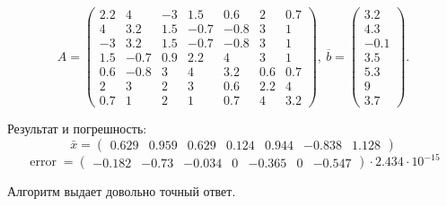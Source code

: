         \[
            A = \begin{pmatrix}
                2.2 & 4 & -3 & 1.5 & 0.6 & 2 & 0.7 \\
                4 & 3.2 & 1.5 & -0.7 & -0.8 & 3 & 1 \\
                -3 & 3.2 & 1.5 & -0.7 & -0.8 & 3 & 1 \\
                1.5 & -0.7 & 0.9 & 2.2 & 4 & 3 & 1 \\
                0.6 & -0.8 & 3 & 4 & 3.2 & 0.6 & 0.7 \\
                2 & 3 & 2 & 3 & 0.6 & 2.2 & 4 \\
                0.7 & 1 & 2 & 1 & 0.7 & 4 & 3.2
            \end{pmatrix}
            , ~ \overline{b} = \begin{pmatrix}
                3.2 \\
                4.3 \\
                -0.1 \\
                3.5 \\
                5.3 \\
                9 \\
                3.7
            \end{pmatrix}
        .\] 

        Результат и погрешность:
        \[ \displaystyle \bar x = \begin{pmatrix}
            0.629 & 0.959 & 0.629 & 0.124 & 0.944 & -0.838 & 1.128
        \end{pmatrix} \] 
        \[ \displaystyle \operatorname{error} = \begin{pmatrix}
            -0.182 & -0.73 & -0.034 & 0 & -0.365 & 0 & -0.547
        \end{pmatrix} \cdot 2.434 \cdot 10^{-15} \]


        
        Алгоритм выдает довольно точный ответ.
